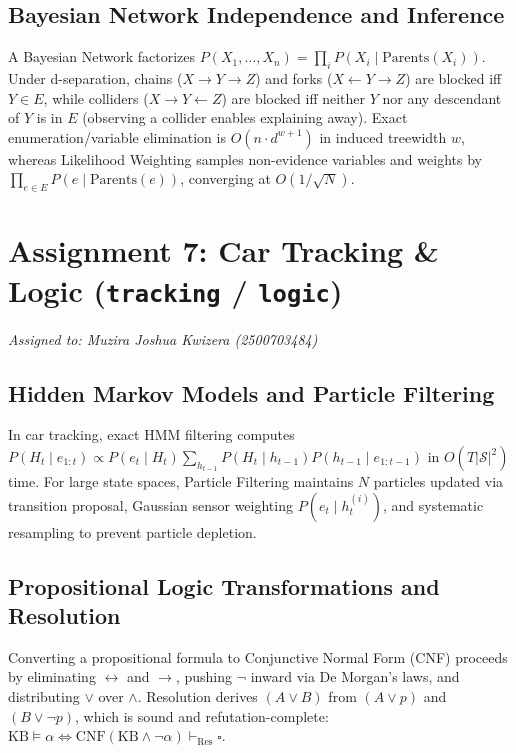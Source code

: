 \documentclass[11pt,a4paper]{article}
\begin{document}
\subsection{Bayesian Network Independence and Inference}
A Bayesian Network factorizes $P(X_1, \dots, X_n) = \prod_i P(X_i \mid \text{Parents}(X_i))$. Under d-separation, chains ($X \to Y \to Z$) and forks ($X \leftarrow Y \to Z$) are blocked iff $Y \in E$, while colliders ($X \to Y \leftarrow Z$) are blocked iff neither $Y$ nor any descendant of $Y$ is in $E$ (observing a collider enables explaining away). Exact enumeration/variable elimination is $O(n \cdot d^{w+1})$ in induced treewidth $w$, whereas Likelihood Weighting samples non-evidence variables and weights by $\prod_{e \in E} P(e \mid \text{Parents}(e))$, converging at $O(1/\sqrt{N})$.

\section{Assignment 7: Car Tracking \& Logic (\texttt{tracking} / \texttt{logic})}
\textit{Assigned to: Muzira Joshua Kwizera (2500703484)}

\subsection{Hidden Markov Models and Particle Filtering}
In car tracking, exact HMM filtering computes $P(H_t \mid e_{1:t}) \propto P(e_t \mid H_t) \sum_{h_{t-1}} P(H_t \mid h_{t-1}) P(h_{t-1} \mid e_{1:t-1})$ in $O(T |\mathcal{S}|^2)$ time. For large state spaces, Particle Filtering maintains $N$ particles updated via transition proposal, Gaussian sensor weighting $P(e_t \mid h_t^{(i)})$, and systematic resampling to prevent particle depletion.

\subsection{Propositional Logic Transformations and Resolution}
Converting a propositional formula to Conjunctive Normal Form (CNF) proceeds by eliminating $\leftrightarrow$ and $\to$, pushing $\neg$ inward via De Morgan's laws, and distributing $\lor$ over $\land$. Resolution derives $(A \lor B)$ from $(A \lor p)$ and $(B \lor \neg p)$, which is sound and refutation-complete: $\text{KB} \models \alpha \iff \text{CNF}(\text{KB} \land \neg\alpha) \vdash_{\text{Res}} \square$.
\end{document}
